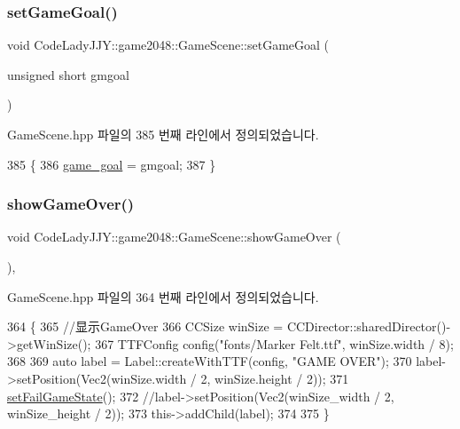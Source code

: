 \subsubsection{\texorpdfstring{set\+Game\+Goal()}{setGameGoal()}}
{\footnotesize\ttfamily void Code\+Lady\+J\+J\+Y\+::game2048\+::\+Game\+Scene\+::set\+Game\+Goal (\begin{DoxyParamCaption}\item[{unsigned short}]{gmgoal }\end{DoxyParamCaption})\hspace{0.3cm}{\ttfamily [inline]}}



Game\+Scene.\+hpp 파일의 385 번째 라인에서 정의되었습니다.


\begin{DoxyCode}
385                                            \{
386         \hyperlink{class_code_lady_j_j_y_1_1game2048_1_1_game_scene_a32978808e5a60713a1d8bf085c2d3e11}{game\_goal} = gmgoal;
387     \}
\end{DoxyCode}
\mbox{\label{class_code_lady_j_j_y_1_1game2048_1_1_game_scene_aa4bf235881780a4db15f68759db4f922}} 
\subsubsection{\texorpdfstring{show\+Game\+Over()}{showGameOver()}}
{\footnotesize\ttfamily void Code\+Lady\+J\+J\+Y\+::game2048\+::\+Game\+Scene\+::show\+Game\+Over (\begin{DoxyParamCaption}{ }\end{DoxyParamCaption})\hspace{0.3cm}{\ttfamily [inline]}, {\ttfamily [private]}}



Game\+Scene.\+hpp 파일의 364 번째 라인에서 정의되었습니다.


\begin{DoxyCode}
364                    \{
365     \textcolor{comment}{//显示GameOver}
366         CCSize winSize = CCDirector::sharedDirector()->getWinSize();
367     TTFConfig config(\textcolor{stringliteral}{"fonts/Marker Felt.ttf"}, winSize.width / 8);
368         
369     \textcolor{keyword}{auto} label = Label::createWithTTF(config, \textcolor{stringliteral}{"GAME OVER"});
370         label->setPosition(Vec2(winSize.width / 2, winSize.height / 2));
371     \hyperlink{class_code_lady_j_j_y_1_1game2048_1_1_game_scene_a85a543aab574d4d4c883da63e57ab47f}{setFailGameState}();
372     \textcolor{comment}{//label->setPosition(Vec2(winSize\_width / 2, winSize\_height / 2));}
373     this->addChild(label);
374     
375 \}
\end{DoxyCode}


